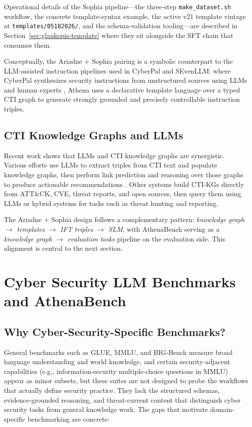 \documentclass[unnumsec,webpdf,contemporary,large]{oup-authoring-template}
\theoremstyle{thmstyleone}
\theoremstyle{thmstyletwo}
\theoremstyle{thmstylethree}
\begin{document}
Operational details of the Sophia pipeline---the three-step \texttt{make\_dataset.sh} workflow, the concrete template-syntax example, the active v21 template vintage at \texttt{templates/05182026/}, and the schema-validation tooling---are described in Section~\ref{sec:glaukopis-template} where they sit alongside the SFT chain that consumes them.

Conceptually, the Ariadne + Sophia pairing is a symbolic counterpart to the LLM-assisted instruction pipelines used in CyberPal and SEvenLLM: where CyberPal synthesizes security instructions from unstructured sources using LLMs and human experts \cite{levi2024cyberpal,levi2025toward}, Athena uses a declarative template language over a typed CTI graph to generate strongly grounded and precisely controllable instruction triples.

\subsection{CTI Knowledge Graphs and LLMs}

Recent work shows that LLMs and CTI knowledge graphs are synergistic. Various efforts use LLMs to extract triples from CTI text and populate knowledge graphs, then perform link prediction and reasoning over those graphs to produce actionable recommendations \cite{fieblinger2024kg,zhang2023cyberkg,wu2022opencykg,yu2024ctikg,zhao2024kctiaa}. Other systems build CTI-KGs directly from ATT\&CK, CVE, threat reports, and open sources, then query them using LLMs or hybrid systems for tasks such as threat hunting and reporting.

The Ariadne + Sophia design follows a complementary pattern: \emph{knowledge graph $\rightarrow$ templates $\rightarrow$ IFT triples $\rightarrow$ SLM}, with AthenaBench serving as a \emph{knowledge graph $\rightarrow$ evaluation tasks} pipeline on the evaluation side. This alignment is central to the next section.

\section{Cyber Security LLM Benchmarks and AthenaBench}
\label{sec:benchmarks}

\subsection{Why Cyber-Security-Specific Benchmarks?}

General benchmarks such as GLUE, MMLU, and BIG-Bench measure broad language understanding and world knowledge, and certain security-adjacent capabilities (e.g., information-security multiple-choice questions in MMLU) appear as minor subsets, but these suites are not designed to probe the workflows that actually define security practice. They lack the structured schemas, evidence-grounded reasoning, and threat-current content that distinguish cyber security tasks from general knowledge work. The gaps that motivate domain-specific benchmarking are concrete:
\end{document}
